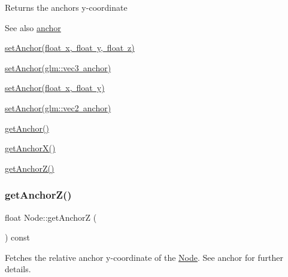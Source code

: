 \begin{DoxyReturn}{Returns}
the anchor\textquotesingle{}s y-\/coordinate 
\end{DoxyReturn}
\begin{DoxySeeAlso}{See also}
\mbox{\hyperlink{classsage_1_1Node_a8698d732514fa2caba0ccee46dbae17a}{anchor}} 

\mbox{\hyperlink{classsage_1_1Node_a04d15cec594320725e6ef44756346d2a}{set\+Anchor(float x, float y, float z)}} 

\mbox{\hyperlink{classsage_1_1Node_a96a786cd6d6750d60c8195aa4895de7c}{set\+Anchor(glm\+::vec3 anchor)}} 

\mbox{\hyperlink{classsage_1_1Node_a8813a645a74f6ab59b25d434e65035c6}{set\+Anchor(float x, float y)}} 

\mbox{\hyperlink{classsage_1_1Node_a957a7e578660950b8518926239397ea0}{set\+Anchor(glm\+::vec2 anchor)}} 

\mbox{\hyperlink{classsage_1_1Node_a1314e39981d8adee8a75c96f29c9e181}{get\+Anchor()}} 

\mbox{\hyperlink{classsage_1_1Node_aa5f31c33d60b32b618d3beaf4e5c6c51}{get\+Anchor\+X()}} 

\mbox{\hyperlink{classsage_1_1Node_a13d0e0b056b8e29091e385f17f8c62f6}{get\+Anchor\+Z()}} 
\end{DoxySeeAlso}
\mbox{\label{classsage_1_1Node_a13d0e0b056b8e29091e385f17f8c62f6}} 
\subsubsection{\texorpdfstring{getAnchorZ()}{getAnchorZ()}}
{\footnotesize\ttfamily float Node\+::get\+AnchorZ (\begin{DoxyParamCaption}{ }\end{DoxyParamCaption}) const}



Fetches the relative anchor y-\/coordinate of the \mbox{\hyperlink{classsage_1_1Node}{Node}}. See anchor for further details. 

